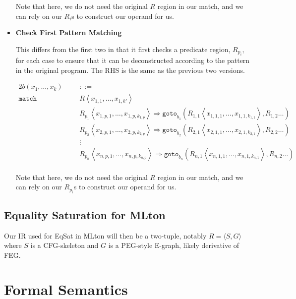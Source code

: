 \documentclass{article}
\begin{document}
\begin{itemize}
Note that here, we do not need the original $R$ region in our match, and we can rely on our $R_{i}$s to construct our operand for us.

\item \textbf{Check First Pattern Matching}

This differs from the first two in that it first checks a predicate region, $R_{p_i}$, for each case to ensure that it can be deconstructed according to the pattern in the original program. The RHS is the same as the previous two versions.

\begin{alignat*}{2}
b(x_1, \dots, x_k) &&&::=  \\
\texttt{match} \, &&& R \left\langle x_{1,1}, \dots, x_{1,k'} \right\rangle \\
    & && R_{p_1} \left\langle x_{1,p,1}, \dots, x_{1,p,k_{1,p}} \right\rangle \Rightarrow \texttt{goto}_{b_1} \left( R_{1,1} \left\langle x_{1,1,1}, \dots, x_{1,1,k_{1,1}} \right\rangle, R_{1,2} \dots\right) \\
    & && R_{p_2} \left\langle x_{2,p,1}, \dots, x_{2,p,k_{2,p}} \right\rangle \Rightarrow \texttt{goto}_{b_2} \left( R_{2,1} \left\langle x_{2,1,1}, \dots, x_{2,1,k_{2,1}} \right\rangle, R_{2,2} \dots\right) \\
    & &&\vdots \\
    & && R_{p_n} \left\langle x_{n,p,1}, \dots, x_{n,p,k_{n,p}} \right\rangle \Rightarrow \texttt{goto}_{b_n} \left( R_{n,1} \left\langle x_{n,1,1}, \dots, x_{n,1,k_{n,1}} \right\rangle, R_{n,2} \dots\right) \\
\end{alignat*}

Note that here, we do not need the original $R$ region in our match, and we can rely on our $R_{p_i}$s to construct our operand for us.

\end{itemize}

\subsection{Equality Saturation for MLton}

Our IR used for EqSat in MLton will then be a two-tuple, notably $R=\langle S, G \rangle$ where $S$ is a CFG-skeleton and $G$ is a PEG-style E-graph, likely derivative of FEG.


\section{Formal Semantics}
\end{document}
